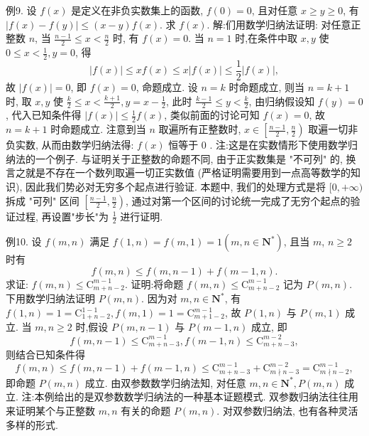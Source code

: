 例9. 设 $f(x)$ 是定义在非负实数集上的函数, $f(0)=0$, 且对任意 $x \geqslant y \geqslant 0$, 有 $|f(x)-f(y)| \leqslant(x-y) f(x)$. 求 $f(x)$.
解:们用数学归纳法证明: 对任意正整数 $n$, 当 $\frac{n-1}{2} \leqslant x<\frac{n}{2}$ 时, 有 $f(x)=0$.
当 $n=1$ 时,在条件中取 $x, y$ 使 $0 \leqslant x<\frac{1}{2}, y=0$, 得
$$
|f(x)| \leqslant x f(x) \leqslant x|f(x)| \leqslant \frac{1}{2}|f(x)|,
$$
故 $|f(x)|=0$, 即 $f(x)=0$, 命题成立.
设 $n=k$ 时命题成立, 则当 $n=k+1$ 时, 取 $x, y$ 使 $\frac{k}{2} \leqslant x<\frac{k+1}{2}, y=x- \frac{1}{2}$, 此时 $\frac{k-1}{2} \leqslant y<\frac{k}{2}$, 由归纳假设知 $f(y)=0$, 代入已知条件得 $|f(x)| \leqslant \frac{1}{2} f(x)$, 类似前面的讨论可知 $f(x)=0$, 故 $n=k+1$ 时命题成立.
注意到当 $n$ 取遍所有正整数时, $x \in\left[\frac{n-1}{2}, \frac{n}{2}\right)$ 取遍一切非负实数, 从而由数学归纳法得: $f(x)$ 恒等于 0 .
注:这是在实数情形下使用数学归纳法的一个例子.
与证明关于正整数的命题不同, 由于正实数集是 "不可列" 的, 换言之就是不存在一个数列取遍一切正实数值 (严格证明需要用到一点高等数学的知识), 因此我们势必对无穷多个起点进行验证.
本题中, 我们的处理方式是将 $[0,+\infty)$ 拆成 "可列" 区间 $\left[\frac{n-1}{2}, \frac{n}{2}\right)$, 通过对第一个区间的讨论统一完成了无穷个起点的验证过程, 再设置"步长"为 $\frac{1}{2}$ 进行证明.



例10. 设 $f(m, n)$ 满足 $f(1, n)=f(m, 1)=1\left(m, n \in \mathbf{N}^*\right)$, 且当 $m$, $n \geqslant 2$ 时有
$$
f(m, n) \leqslant f(m, n-1)+f(m-1, n) .
$$
求证: $f(m, n) \leqslant \mathrm{C}_{m+n-2}^{m-1}$.
证明:将命题 $f(m, n) \leqslant \mathrm{C}_{m+n-2}^{m-1}$ 记为 $P(m, n)$. 下用数学归纳法证明 $P(m, n)$.
因为对 $m, n \in \mathbf{N}^*$, 有 $f(1, n)=1=\mathrm{C}_{1+n-2}^{1-1}, f(m, 1)=1=\mathrm{C}_{m+1-2}^{m-1}$, 故 $P(1, n)$ 与 $P(m, 1)$ 成立.
当 $m, n \geqslant 2$ 时,假设 $P(m, n-1)$ 与 $P(m-1, n)$ 成立, 即
$$
f(m, n-1) \leqslant \mathrm{C}_{m+n-3}^{m-1}, f(m-1, n) \leqslant \mathrm{C}_{m+n-3}^{m-2},
$$
则结合已知条件得
$$
f(m, n) \leqslant f(m, n-1)+f(m-1, n) \leqslant \mathrm{C}_{m+n-3}^{m-1}+\mathrm{C}_{m \nmid n-3}^{m-2}=\mathrm{C}_{m \nmid n-2}^{m-1},
$$
即命题 $P(m, n)$ 成立.
由双参数数学归纳法知, 对任意 $m, n \in \mathbf{N}^*, P(m, n)$ 成立.
注:本例给出的是双参数数学归纳法的一种基本证题模式.
双参数归纳法往往用来证明某个与正整数 $m, n$ 有关的命题 $P(m, n)$. 对双参数归纳法, 也有各种灵活多样的形式.



